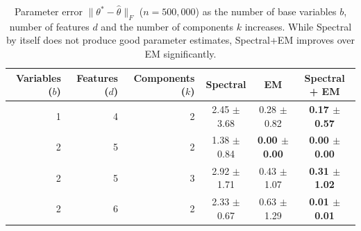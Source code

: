 \begin{table}[tbhp]
\caption{Parameter error $\|\theta^* - \hat \theta\|_F$ ($n = 500,000$)
as the number of base variables $b$, number of features $d$ and the number of components $k$ increases.
While Spectral by itself does not produce good parameter estimates, Spectral+EM improves
over EM significantly.
}
\label{tbl:parameter-recovery}
\vskip 0.15in
\begin{center}
\begin{small}
\begin{sc}

  \begin{tabular}{ r r r c c c }
\hline
\abovespace\belowspace
Variables ($b$) & Features ($d$) & Components ($k$) & Spectral & EM & Spectral + EM \\
\hline
\abovespace
  1 & 4 & 2 & 2.45 $\pm$ 3.68 & 0.28 $\pm$ 0.82 & {\bf 0.17 $\pm$ 0.57} \\
2 & 5 & 2 & 1.38 $\pm$ 0.84 & {\bf 0.00 $\pm$ 0.00} & {\bf 0.00 $\pm$ 0.00} \\
  2 & 5 & 3 & 2.92 $\pm$ 1.71 & 0.43 $\pm$ 1.07 & {\bf 0.31 $\pm$ 1.02} \\
  2 & 6 & 2 & 2.33 $\pm$ 0.67 & 0.63 $\pm$ 1.29 & {\bf 0.01 $\pm$ 0.01} \\



\end{tabular}
\end{sc}
\end{small}
\end{center}
\end{table}
